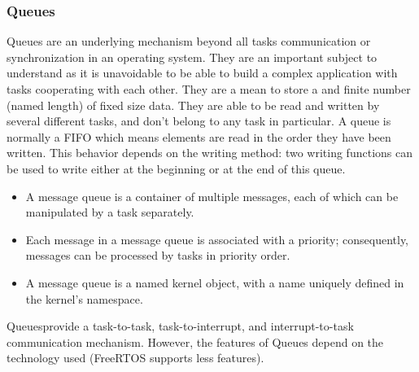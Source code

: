 \subsubsection{Queues}
Queues are an underlying mechanism beyond all tasks communication or synchronization in an operating system.
They are an important subject to understand as it is unavoidable to be able to build a complex application with tasks cooperating with each other.
They are a mean to store a and finite number (named \glqq{}length\grqq) of fixed size data.
They are able to be read and written by several different tasks, and don't belong to any task in particular.
A queue is normally a FIFO which means elements are read in the order they have been written.
This behavior depends on the writing method: two writing functions can be used to write either at the beginning or at the end of this queue.
\begin{itemize}
  \item A message queue is a container of multiple messages, each of which can be manipulated by a task separately.
  \item Each message in a message queue is associated with a priority; consequently, messages can be processed by tasks in priority order.
  \item A message queue is a named kernel object, with a name uniquely defined in the kernel’s namespace.
\end{itemize}
\glqq{}Queues\grqq provide a task-to-task, task-to-interrupt, and interrupt-to-task communication mechanism.
However, the features of Queues depend on the technology used (FreeRTOS supports less features).

